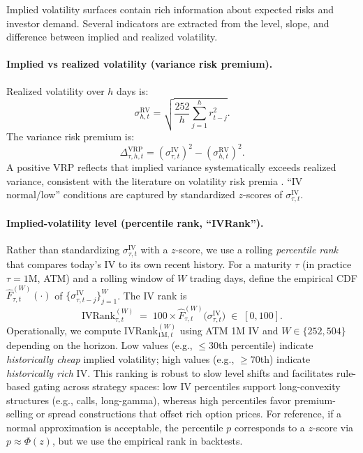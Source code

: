 \documentclass[12pt,a4paper]{report}
\begin{document}
Implied volatility surfaces contain rich information about expected risks and investor demand. Several indicators are extracted from the level, slope, and difference between implied and realized volatility.

\paragraph{Implied vs realized volatility (variance risk premium).}  
Realized volatility over $h$ days is:
\[
\sigma^{\text{RV}}_{h,t}=\sqrt{\frac{252}{h}\sum_{j=1}^h r_{t-j}^2}.
\]
The variance risk premium is:
\[
\Delta^{\text{VRP}}_{\tau,h,t} = \left(\sigma^{\text{IV}}_{\tau,t}\right)^2 - \left(\sigma^{\text{RV}}_{h,t}\right)^2.
\]
A positive VRP reflects that implied variance systematically exceeds realized variance, consistent with the literature on volatility risk premia \citep{carr2001empirical, bollerslev2009volatility}. ``IV normal/low'' conditions are captured by standardized $z$-scores of $\sigma^{\text{IV}}_{\tau,t}$.


\paragraph{Implied-volatility level (percentile rank, ``IVRank'').}
Rather than standardizing $\sigma^{\text{IV}}_{\tau,t}$ with a $z$-score, we use a rolling
\emph{percentile rank} that compares today’s IV to its own recent history. For a maturity
$\tau$ (in practice $\tau=1$M, ATM) and a rolling window of $W$ trading days, define the
empirical CDF $\widehat{F}^{(W)}_{\tau,t}(\cdot)$ of
$\{\sigma^{\text{IV}}_{\tau,t-j}\}_{j=1}^{W}$. The IV rank is
\[
\text{IVRank}_{\tau,t}^{(W)} \;=\; 100 \times
\widehat{F}^{(W)}_{\tau,t}\!\big(\sigma^{\text{IV}}_{\tau,t}\big)
\;\in\;[0,100].
\]
Operationally, we compute $\text{IVRank}_{1\text{M},t}^{(W)}$ using ATM 1M IV and
$W\in\{252,504\}$ depending on the horizon. Low values (e.g., $\le 30$th percentile)
indicate \emph{historically cheap} implied volatility; high values (e.g., $\ge 70$th) indicate
\emph{historically rich} IV. This ranking is robust to slow level shifts and facilitates
rule-based gating across strategy spaces: low IV percentiles support long-convexity
structures (e.g., calls, long-gamma), whereas high percentiles favor premium-selling or
spread constructions that offset rich option prices. For reference, if a normal approximation
is acceptable, the percentile $p$ corresponds to a $z$-score via $p\approx \Phi(z)$, but we
use the empirical rank in backtests.
\end{document}
